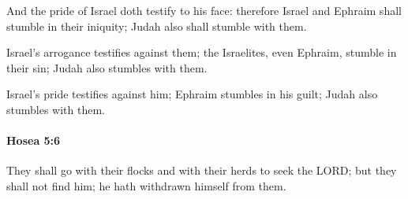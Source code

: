			\begin{versebox}
					\item[BHS] 
					\item[LXX] 
					\item[ASV] And the pride of Israel doth testify to his face: therefore Israel and Ephraim shall stumble in their iniquity; Judah also shall stumble with them.
					\item[NIV] Israel’s arrogance testifies against them; the Israelites, even Ephraim, stumble in their sin; Judah also stumbles with them.
					\item[NRSV] Israel’s pride testifies against him; Ephraim stumbles in his guilt; Judah also stumbles with them.
			\end{versebox}

		\paragraph{Hosea 5:6} %
			\label{HOSEA-5-6}

			They shall go with their flocks and with their herds to seek the LORD; but they shall not find him; he hath withdrawn himself from them.

